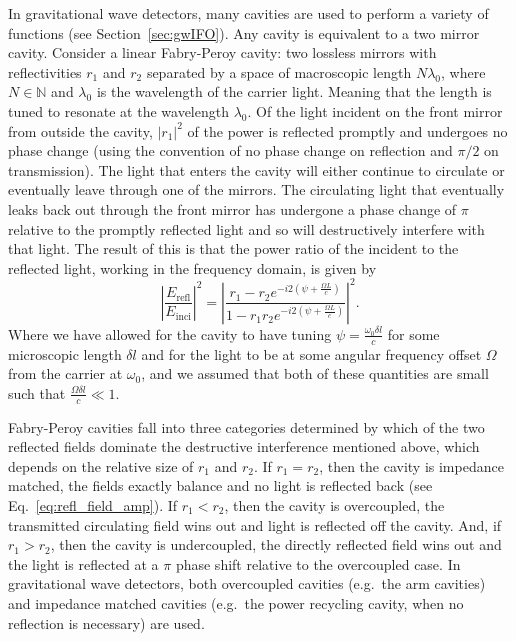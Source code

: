 \documentclass[aps,pra,superscriptaddress,reprint,nofootinbib]{revtex4-1}
\newcommand{\abs}[1]{\left\lvert #1 \right\rvert}
\begin{document}
In gravitational wave detectors, many cavities are used to perform a variety of functions (see Section~\ref{sec:gwIFO}). Any cavity is equivalent to a two mirror cavity. Consider a linear Fabry-Peroy cavity: two lossless mirrors with reflectivities $r_1$ and $r_2$ separated by a space of macroscopic length $N \lambda_0$, where $N \in \mathbb{N}$ and $\lambda_0$ is the wavelength of the carrier light. Meaning that the length is tuned to resonate at the wavelength $\lambda_0$. Of the light incident on the front mirror from outside the cavity, $\abs{r_1}^2$ of the power is reflected promptly and undergoes no phase change (using the convention of no phase change on reflection and $\pi/2$ on transmission). The light that enters the cavity will either continue to circulate or eventually leave through one of the mirrors. The circulating light that eventually leaks back out through the front mirror has undergone a phase change of $\pi$ relative to the promptly reflected light and so will destructively interfere with that light. The result of this is that the power ratio of the incident to the reflected light, working in the frequency domain, is given by~\cite{Danilishin_2012}
\begin{equation}
\label{eq:refl_field_amp}
\abs{\frac{E_{\mathrm{refl}}}{E_{\mathrm{inci}}}}^2 = \abs{\frac{r_1 - r_2 e^{-i 2 (\psi + \frac{\Omega L}{c})}}{1- r_1 r_2 e^{-i 2 (\psi + \frac{\Omega L}{c})}}}^2.
\end{equation}
Where we have allowed for the cavity to have tuning $\psi = \frac{\omega_0 \delta l}{c}$ for some microscopic length $\delta l$ and for the light to be at some angular frequency offset $\Omega$ from the carrier at $\omega_0$, and we assumed that both of these quantities are small such that $\frac{\Omega \delta l}{c} \ll 1$.

Fabry-Peroy cavities fall into three categories determined by which of the two reflected fields dominate the destructive interference mentioned above, which depends on the relative size of $r_1$ and $r_2$. If $r_1 = r_2$, then the cavity is impedance matched, the fields exactly balance and no light is reflected back (see Eq.~\ref{eq:refl_field_amp}). If $r_1 < r_2$, then the cavity is overcoupled, the transmitted circulating field wins out and light is reflected off the cavity. And, if $r_1 > r_2$, then the cavity is undercoupled, the directly reflected field wins out and the light is reflected at a $\pi$ phase shift relative to the overcoupled case. In gravitational wave detectors, both overcoupled cavities (e.g.\ the arm cavities) and impedance matched cavities (e.g.\ the power recycling cavity, when no reflection is necessary) are used.
\end{document}

